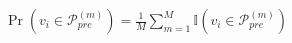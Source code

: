 $\Pr\left(v_i\in\mathcal{P}_{pre}^{(m)}\right)=\frac{1}{M}\sum_{m=1}^{M}\mathbb{I}\left(v_i\in\mathcal{P}_{pre}^{(m)}\right)$
